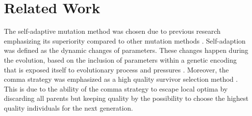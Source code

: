 \section{Related Work}

The self-adaptive mutation method was chosen due to previous research emphasizing its superiority compared to other mutation methods \cite{Teo2006SelfadaptiveMF}. Self-adaption was defined as the dynamic changes of parameters. These changes happen during the evolution, based on the inclusion of parameters within a genetic encoding that is exposed itself to evolutionary process and pressures \cite{series/ncs/EibenS03}. Moreover, the comma strategy was emphasized as a high quality survivor selection method \cite{series/ncs/EibenS03}. This is due to the ability of the comma strategy to escape local optima by discarding all parents but keeping quality by the possibility to choose the highest quality individuals for the next generation.